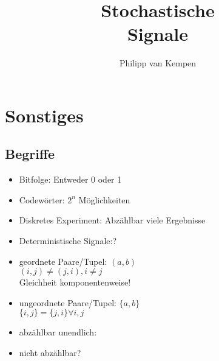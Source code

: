 \documentclass[german]{latex4ei/latex4ei_sheet}
\title{Stochastische\\Signale}
\author{Philipp van Kempen}					%
\begin{document}
\maketitle   %


\section*{Sonstiges}
\subsection*{Begriffe}
	\begin{itemize}
		\item Bitfolge: Entweder 0 oder 1
		\item Codew\"orter: $2^n$ M\"oglichkeiten
		\item Diskretes Experiment: Abz\"ahlbar viele Ergebnisse
		\item Deterministische Signale:?
		\item geordnete Paare/Tupel: $(a,b)$\\
			$(i,j)\neq(j,i), i\neq j$\\
			Gleichheit komponentenweise!
		\item ungeordnete Paare/Tupel: $\{a,b\}$\\
			$\{i,j\}=\{j,i\} \forall i,j$
		\item abz\"ahlbar unendlich:\\
		\item nicht abz\"ahlbar?
	\end{itemize}
\end{document}
